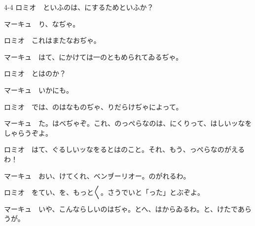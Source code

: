 \documentclass[tate,paper=b6j,jafontsize=9pt]{jlreq}
\begin{document}
\begin{azconvIndented}{4\zw}{-4\zw}
ロミオ　といふのは、にするためといふか？

マーキュ　り、なぢゃ。

ロミオ　これはまたなおぢゃ。

マーキュ　はて、にかけては一のともめられてゐるぢゃ。

ロミオ　とはのか？

マーキュ　いかにも。

ロミオ　では、のはなものぢゃ、りだらけぢゃによって。

マーキュ　た。はべぢゃぞ。これ、のっぺらなのは、にくりって、はしいッなをしゃらうぞよ。

ロミオ　はて、ぐるしいッなをるとはのこと。それ、もう、っぺらなのがえるわ！

マーキュ　おい、けてくれ、ベンヺーリオー。のがれるわ。

ロミオ　をてい、を、もっと{〳〵}。さうでいと「った」とぶぞよ。

マーキュ　いや、こんならしいのはぢゃ。とへ、はからゐるわ。と、けたであらうが。


\end{azconvIndented}
\end{document}
